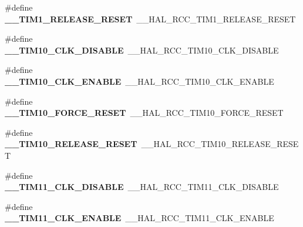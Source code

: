 \begin{DoxyCompactItemize}
\#define {\bfseries \+\_\+\+\_\+\+T\+I\+M1\+\_\+\+R\+E\+L\+E\+A\+S\+E\+\_\+\+R\+E\+S\+ET}~\+\_\+\+\_\+\+H\+A\+L\+\_\+\+R\+C\+C\+\_\+\+T\+I\+M1\+\_\+\+R\+E\+L\+E\+A\+S\+E\+\_\+\+R\+E\+S\+ET
\item 
\mbox{\label{group___h_a_l___r_c_c___aliased_ga6015db503657bee4d141974992681af4}} 
\#define {\bfseries \+\_\+\+\_\+\+T\+I\+M10\+\_\+\+C\+L\+K\+\_\+\+D\+I\+S\+A\+B\+LE}~\+\_\+\+\_\+\+H\+A\+L\+\_\+\+R\+C\+C\+\_\+\+T\+I\+M10\+\_\+\+C\+L\+K\+\_\+\+D\+I\+S\+A\+B\+LE
\item 
\mbox{\label{group___h_a_l___r_c_c___aliased_gaaede2703ebcc0edcfe2508364b465ba2}} 
\#define {\bfseries \+\_\+\+\_\+\+T\+I\+M10\+\_\+\+C\+L\+K\+\_\+\+E\+N\+A\+B\+LE}~\+\_\+\+\_\+\+H\+A\+L\+\_\+\+R\+C\+C\+\_\+\+T\+I\+M10\+\_\+\+C\+L\+K\+\_\+\+E\+N\+A\+B\+LE
\item 
\mbox{\label{group___h_a_l___r_c_c___aliased_ga51608836d363e8f56bcd43ef9846cec4}} 
\#define {\bfseries \+\_\+\+\_\+\+T\+I\+M10\+\_\+\+F\+O\+R\+C\+E\+\_\+\+R\+E\+S\+ET}~\+\_\+\+\_\+\+H\+A\+L\+\_\+\+R\+C\+C\+\_\+\+T\+I\+M10\+\_\+\+F\+O\+R\+C\+E\+\_\+\+R\+E\+S\+ET
\item 
\mbox{\label{group___h_a_l___r_c_c___aliased_ga69408398d8d314c1ad20868dc155bd1a}} 
\#define {\bfseries \+\_\+\+\_\+\+T\+I\+M10\+\_\+\+R\+E\+L\+E\+A\+S\+E\+\_\+\+R\+E\+S\+ET}~\+\_\+\+\_\+\+H\+A\+L\+\_\+\+R\+C\+C\+\_\+\+T\+I\+M10\+\_\+\+R\+E\+L\+E\+A\+S\+E\+\_\+\+R\+E\+S\+ET
\item 
\mbox{\label{group___h_a_l___r_c_c___aliased_ga976ce9e8e4584c22a293cac41a8c681a}} 
\#define {\bfseries \+\_\+\+\_\+\+T\+I\+M11\+\_\+\+C\+L\+K\+\_\+\+D\+I\+S\+A\+B\+LE}~\+\_\+\+\_\+\+H\+A\+L\+\_\+\+R\+C\+C\+\_\+\+T\+I\+M11\+\_\+\+C\+L\+K\+\_\+\+D\+I\+S\+A\+B\+LE
\item 
\mbox{\label{group___h_a_l___r_c_c___aliased_ga6cc8eb068efb87a58f7e4ed1c052bda6}} 
\#define {\bfseries \+\_\+\+\_\+\+T\+I\+M11\+\_\+\+C\+L\+K\+\_\+\+E\+N\+A\+B\+LE}~\+\_\+\+\_\+\+H\+A\+L\+\_\+\+R\+C\+C\+\_\+\+T\+I\+M11\+\_\+\+C\+L\+K\+\_\+\+E\+N\+A\+B\+LE
\item 
\mbox{\label{group___h_a_l___r_c_c___aliased_gabd9681b9a7bba79cd54826cce394f45a}} 

\end{DoxyCompactItemize}
